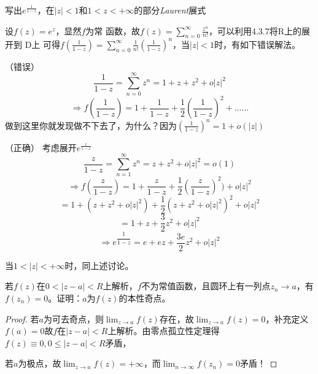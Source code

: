 \begin{eg}
	\color{blue}写出$e^{\frac{1}{1-z}}$，在$|z|<1$和$1<z<+ \infty$的部分\emph{Laurent}展式
	
	\color{black}设$f(z)=e^{z}$，显然$f$为常    函数，故$f(z)=\sum_{n=0}^{\infty}\frac{z^{n}}{n!}$，可以利用4.3.7将R上的展开到 D上
	可得$f(\frac{1}{1-z})=\sum\limits_{n=0}^{\infty}\frac{1}{n!}(\frac{1}{1-z})^{n}$，当$|z|<1$时，有如下错误解法。
	\begin{jie}{（错误）}
		\begin{equation*}
		\frac{1}{1-z}=\sum_{n=0}^{\infty}z^{n}=1+z+z^{2}+o|z|^{2} 
		\end{equation*}
		\begin{equation*}
		\Rightarrow f(\frac{1}{1-z})=1+\frac{1}{1-z}+\frac{1}{2}(\frac{1}{1-z})^{2}+...\dots
		\end{equation*}
		做到这里你就发现做不下去了，为什么？因为$(\frac{1}{1-z})^{n}=1+o(|z|)$
	\end{jie}
	\begin{jie}{（正确）}
		考虑展开$e^{\frac{z}{1-z}}$
		\begin{equation*}
		\dfrac{z}{1-z}=\sum\limits_{n=1}^{\infty}z^{n}=z+z^{2}+o|z|^{2} =o(1)
		\end{equation*}
		\begin{equation*}
		\Rightarrow f(\dfrac{z}{1-z})=1+\dfrac{z}{1-z}+\dfrac{1}{2}(\dfrac{z}{1-z})^{2})+o|z|^{2}
		\end{equation*}
		\begin{equation*}
		=1+(z+z^{2}+o|z|^{2})+\frac{1}{2}(z+z^{2}+o|z|^{2})^{2}+o|z|^{2}
		\end{equation*}
		\begin{equation*}
		=1+z+\dfrac{3}{2}z^{2}+o|z|^{2}
		\end{equation*}
		\begin{equation*}
		\Rightarrow e^{\dfrac{1}{1-z}}=e+ez+\dfrac{3e}{2}z^{2}+o|z|^{2}
		\end{equation*}
	\end{jie}
	当$1<|z|<+\infty$时，同上述讨论。
\end{eg}
\begin{eg}
	\color{blue}若$f(z)$在$0<|z-a|<R$上解析，$f$不为常值函数，且圆环上有一列点$z_{n}\rightarrow a$，有$f(z_{n})=0$。证明：$a$为$f(z)$的本性奇点。
	
	\color{black}
	\begin{proof}
		若$a$为可去奇点，则$\displaystyle\lim_{z\rightarrow a}f(z)$存在，故$\displaystyle\lim_{z\rightarrow a}f(z)=0$，补充定义$f(a)=0$故$f$在$|z-a|<R$上解析。由零点孤立性定理得$f(z)\equiv 0 , 0\le |z-a|<R$矛盾，
		
		若$a$为极点，故$\displaystyle\lim_{z\rightarrow a}f(z)=+\infty$，而$\displaystyle\lim_{n\rightarrow \infty}f(z_{n})=0$矛盾！
	\end{proof}	
\end{eg}
